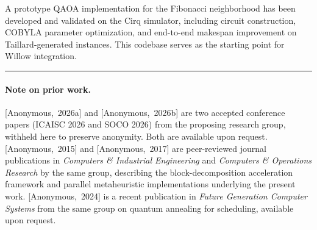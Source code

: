 \documentclass[11pt,a4paper]{article}
\newcommand{\anonA}{[Anonymous,~2026a]}
\newcommand{\anonB}{[Anonymous,~2026b]}
\newcommand{\anonC}{[Anonymous,~2015]}
\newcommand{\anonD}{[Anonymous,~2017]}
\newcommand{\anonE}{[Anonymous,~2024]}
\begin{document}
A prototype QAOA implementation for the Fibonacci neighborhood
has been developed and validated on the Cirq simulator, including
circuit construction, COBYLA parameter optimization, and
end-to-end makespan improvement on Taillard-generated instances.
This codebase serves as the starting point for Willow integration.

\bigskip\hrule\bigskip

\paragraph{Note on prior work.}
\anonA{} and \anonB{} are two accepted conference papers (ICAISC 2026 and SOCO 2026)
from the proposing research group, withheld here to preserve anonymity.
Both are available upon request.
\anonC{} and \anonD{} are peer-reviewed journal publications in
\textit{Computers \& Industrial Engineering} and
\textit{Computers \& Operations Research} by the same group,
describing the block-decomposition acceleration framework and
parallel metaheuristic implementations underlying the present work.
\anonE{} is a recent publication in \textit{Future Generation Computer
Systems} from the same group on quantum annealing for scheduling,
available upon request.
\end{document}
